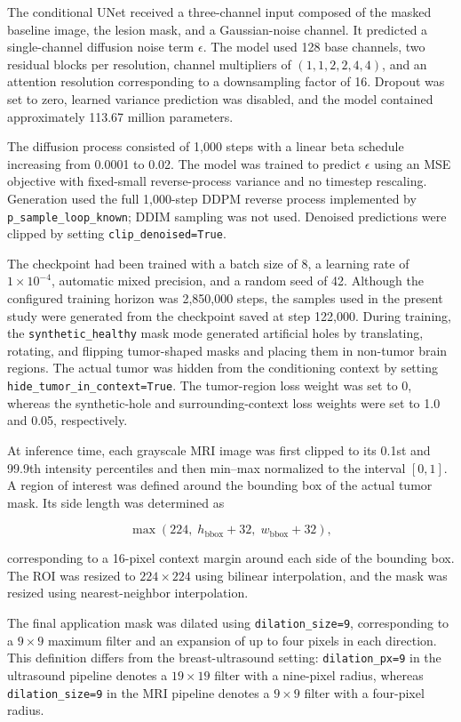 The conditional UNet received a three-channel input composed of the masked baseline image, the lesion mask, and a Gaussian-noise channel. It predicted a single-channel diffusion noise term $\epsilon$. The model used 128 base channels, two residual blocks per resolution, channel multipliers of $(1, 1, 2, 2, 4, 4)$, and an attention resolution corresponding to a downsampling factor of 16. Dropout was set to zero, learned variance prediction was disabled, and the model contained approximately 113.67 million parameters.

The diffusion process consisted of 1,000 steps with a linear beta schedule increasing from 0.0001 to 0.02. The model was trained to predict $\epsilon$ using an MSE objective with fixed-small reverse-process variance and no timestep rescaling. Generation used the full 1,000-step DDPM reverse process implemented by \texttt{p\_sample\_loop\_known}; DDIM sampling was not used. Denoised predictions were clipped by setting \texttt{clip\_denoised=True}.

The checkpoint had been trained with a batch size of 8, a learning rate of $1 \times 10^{-4}$, automatic mixed precision, and a random seed of 42. Although the configured training horizon was 2,850,000 steps, the samples used in the present study were generated from the checkpoint saved at step 122,000. During training, the \texttt{synthetic\_healthy} mask mode generated artificial holes by translating, rotating, and flipping tumor-shaped masks and placing them in non-tumor brain regions. The actual tumor was hidden from the conditioning context by setting \texttt{hide\_tumor\_in\_context=True}. The tumor-region loss weight was set to 0, whereas the synthetic-hole and surrounding-context loss weights were set to 1.0 and 0.05, respectively.

At inference time, each grayscale MRI image was first clipped to its 0.1st and 99.9th intensity percentiles and then min--max normalized to the interval $[0,1]$. A region of interest was defined around the bounding box of the actual tumor mask. Its side length was determined as

\[
\max\!\left(
224,\;
h_{\mathrm{bbox}}+32,\;
w_{\mathrm{bbox}}+32
\right),
\]

corresponding to a 16-pixel context margin around each side of the bounding box. The ROI was resized to $224 \times 224$ using bilinear interpolation, and the mask was resized using nearest-neighbor interpolation.

The final application mask was dilated using \texttt{dilation\_size=9}, corresponding to a $9 \times 9$ maximum filter and an expansion of up to four pixels in each direction. This definition differs from the breast-ultrasound setting: \texttt{dilation\_px=9} in the ultrasound pipeline denotes a $19 \times 19$ filter with a nine-pixel radius, whereas \texttt{dilation\_size=9} in the MRI pipeline denotes a $9 \times 9$ filter with a four-pixel radius.

